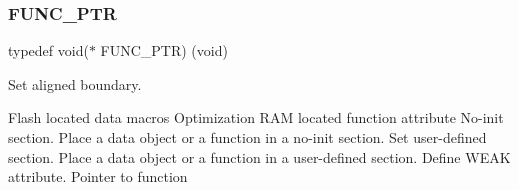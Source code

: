 \subsubsection{\texorpdfstring{F\+U\+N\+C\+\_\+\+P\+TR}{FUNC\_PTR}}
{\footnotesize\ttfamily typedef void($\ast$ F\+U\+N\+C\+\_\+\+P\+TR) (void)}



Set aligned boundary. 

Flash located data macros Optimization R\+AM located function attribute No-\/init section. Place a data object or a function in a no-\/init section. Set user-\/defined section. Place a data object or a function in a user-\/defined section. Define W\+E\+AK attribute. Pointer to function 